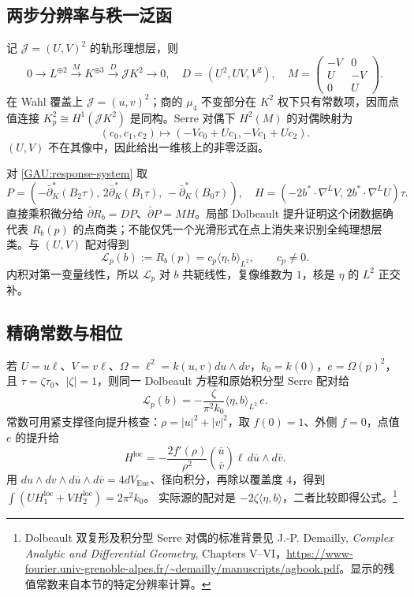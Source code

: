 \documentclass[UTF8,fontset=fandol,zihao=-4,oneside,openany]{ctexbook}
\theoremstyle{cjkplain}
\numberwithin{equation}{chapter}
\begin{document}
\subsection{两步分辨率与秩一泛函}
记 $\mathcal J=(U,V)^2$ 的轨形理想层，则
\begin{equation}\label{GAU:resolution}
0\longrightarrow L^{\oplus2}
\xrightarrow{\ M\ }K^{\oplus3}
\xrightarrow{\ D\ }\mathcal JK^2\longrightarrow0,
\quad D=(U^2,UV,V^2),\quad
M=\begin{pmatrix}-V&0\\U&-V\\0&U\end{pmatrix}.
\end{equation}
在 Wahl 覆盖上 $\mathcal J=(u,v)^2$；商的 $\mu_4$ 不变部分在 $K^2$ 权下只有常数项，因而点值连接
$K_p^2\cong H^1(\mathcal JK^2)$ 是同构。Serre 对偶下 $H^2(M)$ 的对偶映射为
\[
(c_0,c_1,c_2)\longmapsto(-Vc_0+Uc_1,-Vc_1+Uc_2).
\]
$(U,V)$ 不在其像中，因此给出一维核上的非零泛函。

对 \eqref{GAU:response-system} 取
\[
P=(-\bar\partial_K^*(B_2\tau),\,2\bar\partial_K^*(B_1\tau),\,-\bar\partial_K^*(B_0\tau)),
\quad
H=(-2b^*\!\cdot\nabla^LV,\,2b^*\!\cdot\nabla^LU)\tau.
\]
直接乘积微分给 $\bar\partial R_b=DP$、$\bar\partial P=MH$。局部 Dolbeault 提升证明这个闭数据确代表 $R_b(p)$ 的点商类；不能仅凭一个光滑形式在点上消失来识别全纯理想层类。与 $(U,V)$ 配对得到
\begin{equation}\label{GAU:rank-one-residue}
\mathcal L_p(b):=R_b(p)=c_p\langle\eta,b\rangle_{L^2},
\qquad c_p\ne0.
\end{equation}
内积对第一变量线性，所以 $\mathcal L_p$ 对 $b$ 共轭线性，复像维数为 $1$，核是 $\eta$ 的 $L^2$ 正交补。

\subsection{精确常数与相位}
若 $U=u\ell$、$V=v\ell$、$\Omega=\ell^2=k(u,v)du\wedge dv$，$k_0=k(0)$，$e=\Omega(p)^2$，且 $\tau=\zeta\tau_0$、$|\zeta|=1$，则同一 Dolbeault 方程和原始积分型 Serre 配对给
\begin{equation}\label{GAU:residue-constant}
\boxed{\mathcal L_p(b)=-\frac{\zeta}{\pi^2k_0}
\langle\eta,b\rangle_{L^2}\,e.}
\end{equation}
常数可用紧支撑径向提升核查：$\rho=|u|^2+|v|^2$，取 $f(0)=1$、外侧 $f=0$，点值 $e$ 的提升给
\[
H^{\mathrm{loc}}=-\frac{2f'(\rho)}{\rho^2}
\binom{\overline u}{\overline v}\ell\,d\overline u\wedge d\overline v.
\]
用 $du\wedge dv\wedge d\overline u\wedge d\overline v=4dV_{\mathrm{Euc}}$、径向积分，再除以覆盖度 $4$，得到
$\int(UH_1^{\mathrm{loc}}+VH_2^{\mathrm{loc}})=2\pi^2k_0$。
实际源的配对是 $-2\zeta\langle\eta,b\rangle$，二者比较即得公式。\footnote{Dolbeault 双复形及积分型 Serre 对偶的标准背景见 J.-P. Demailly, \emph{Complex Analytic and Differential Geometry}, Chapters V--VI，\url{https://www-fourier.univ-grenoble-alpes.fr/~demailly/manuscripts/agbook.pdf}。显示的残值常数来自本节的特定分辨率计算。}
\end{document}

